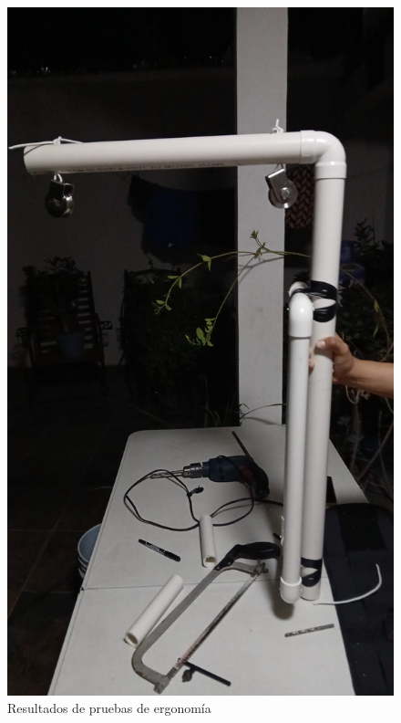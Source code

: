 \begin{figure}
    \centering
    \includegraphics[width=1\textwidth, height=.9\textheight]{img/PruebaErgonomica5.png}
    \caption{Resultados de pruebas de ergonomía}
    \label{fig:ergo-test5}
\end{figure}

